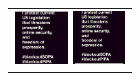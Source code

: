 \documentclass{acm_proc_article-sp}
\newcommand{\thumbheight}{14mm}
\newenvironment{thumbsequence}{}{\makebox[4mm]{}}
\begin{document}
\begin{figure}
\begin{tabular}{p{\textwidth}}
\begin{thumbsequence}
		\includegraphics[height=\thumbheight]{resources/sopa/looseduplicate5.jpg}
		\includegraphics[height=\thumbheight]{resources/sopa/looseduplicate6.jpg}
	\end{thumbsequence}

\end{tabular}
\end{figure}
\end{document}
